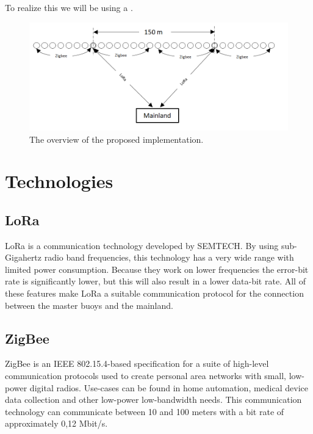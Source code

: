 \documentclass[11pt,a4paper,twoside]{article} %
\begin{document}
To realize this we will be using a .

\begin{figure}[H]
    \centering
    \includegraphics[width=1.0\textwidth]{opstelling.png}
    \caption{The overview of the proposed implementation.}
    \label{fig:Overview}
\end{figure}

\clearpage


\section{Technologies}

\subsection{LoRa}

LoRa is a communication technology developed by SEMTECH. By using sub-Gigahertz radio band frequencies, this technology has a very wide range with limited power consumption. Because they work on lower frequencies the error-bit rate is significantly lower, but this will also result in a lower data-bit rate. All of these features make LoRa a suitable communication protocol for the connection between the master buoys and the mainland.

\subsection{ZigBee}

ZigBee is an IEEE 802.15.4-based specification for a suite of high-level communication protocols used to create personal area networks with small, low-power digital radios. Use-cases can be found in home automation, medical device data collection and other low-power low-bandwidth needs. This communication technology can communicate between 10 and 100 meters with a bit rate of approximately 0,12 Mbit/s.\cite{Zigbee}
\end{document}
